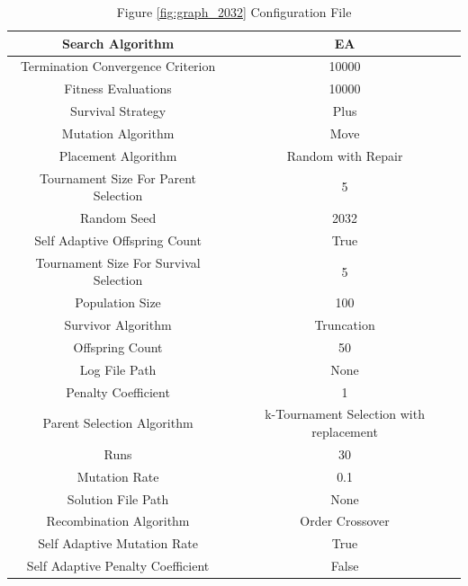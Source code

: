 \documentclass{standalone}
\begin{document}
\begin{table}[!htb]
	\centering
	\caption{Figure \ref{fig:graph_2032} Configuration File}
	\label{tab:graph_2032}
	\begin{tabular}{| c | c |}
		\hline
		Search Algorithm		& EA		 \\
		\hline
		Termination Convergence Criterion		& 10000		 \\
		\hline
		Fitness Evaluations		& 10000		 \\
		\hline
		Survival Strategy		& Plus		 \\
		\hline
		Mutation Algorithm		& Move		 \\
		\hline
		Placement Algorithm		& Random with Repair		 \\
		\hline
		Tournament Size For Parent Selection		& 5		 \\
		\hline
		Random Seed		& 2032		 \\
		\hline
		Self Adaptive Offspring Count		& True		 \\
		\hline
		Tournament Size For Survival Selection		& 5		 \\
		\hline
		Population Size		& 100		 \\
		\hline
		Survivor Algorithm		& Truncation		 \\
		\hline
		Offspring Count		& 50		 \\
		\hline
		Log File Path		& None		 \\
		\hline
		Penalty Coefficient		& 1		 \\
		\hline
		Parent Selection Algorithm		& k-Tournament Selection with replacement		 \\
		\hline
		Runs		& 30		 \\
		\hline
		Mutation Rate		& 0.1		 \\
		\hline
		Solution File Path		& None		 \\
		\hline
		Recombination Algorithm		& Order Crossover		 \\
		\hline
		Self Adaptive Mutation Rate		& True		 \\
		\hline
		Self Adaptive Penalty Coefficient		& False		 \\
		\hline
	\end{tabular}
\end{table}
\end{document}
